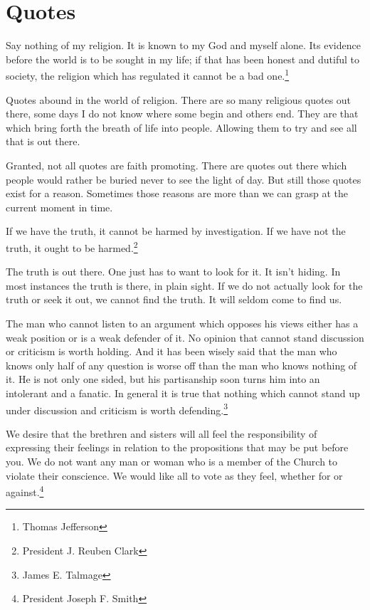 \chapter{Quotes}

\begin{displayquote}
Say nothing of my religion. It is known to my God and myself alone. Its evidence 
before the world is to be sought in my life; if that has been honest and dutiful 
to society, the religion which has regulated it cannot be a bad one.\footnote{
Thomas Jefferson
}
\end{displayquote}

Quotes abound in the world of religion. There are so many religious quotes out 
there, some days I do not know where some begin and others end. They are that 
which bring forth the breath of life into people. Allowing them to try and see 
all that is out there.

Granted, not all quotes are faith promoting. There are quotes out there which 
people would rather be buried never to see the light of day. But still those 
quotes exist for a reason. Sometimes those reasons are more than we can grasp 
at the current moment in time.

\begin{displayquote}
If we have the truth, it cannot be harmed by investigation. 
If we have not the truth, it ought to be harmed.\footnote{
President J. Reuben Clark}
\end{displayquote}

The truth is out there. One just has to want to look for it. It isn't hiding. 
In most instances the truth is there, in plain sight. If we do not actually 
look for the truth or seek it out, we cannot find the truth. It will seldom 
come to find us.

\begin{displayquote}
The man who cannot listen to an argument which opposes his views either has a 
weak position or is a weak defender of it. No opinion that cannot stand 
discussion or criticism is worth holding. And it has been wisely said that 
the man who knows only half of any question is worse off than the man who 
knows nothing of it. He is not only one sided, but his partisanship soon 
turns him into an intolerant and a fanatic. In general it is true that nothing 
which cannot stand up under discussion and criticism is worth
defending.\footnote{James E. Talmage}
\end{displayquote}

\begin{displayquote}
We desire that the brethren and sisters will all feel the responsibility of 
expressing their feelings in relation to the propositions that may be put 
before you. We do not want any man or woman who is a member of the Church to 
violate their conscience. We would like all to vote as they feel, whether for 
or against.\footnote{President Joseph F. Smith}
\end{displayquote}

